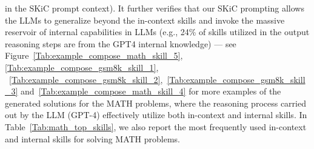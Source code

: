 in the SKiC prompt context). It further verifies that our SKiC prompting allows the LLMs to generalize beyond the in-context skills and invoke the massive reservoir of internal capabilities in LLMs (e.g., 24\% of skills utilized in the output reasoning steps are from the GPT4 internal knowledge) --- see Figure~\ref{Tab:example_compose_math_skill_5}, \ref{Tab:example_compose_gsm8k_skill_1}, ~\ref{Tab:example_compose_gsm8k_skill_2},~\ref{Tab:example_compose_gsm8k_skill_3} and~\ref{Tab:example_compose_math_skill_4} for more examples of the generated solutions for the MATH problems, where the reasoning process carried out by the LLM (GPT-4) effectively utilize both in-context and internal skills. In Table~\ref{Tab:math_top_skills}, we also report the most frequently used in-context and internal skills for solving MATH problems.










\begin{table}[t]
\caption{Testing accuracy and internal skill activation rate on the MATH benchmark. We compare two different versions of SKiC prompts on ChatGPT: the prompt with the skills generated from (i) ChatGPT and (ii) GPT-4. The \emph{internal skill activation rate} refers to the average proportion of skills utilized per question that originate from pre-trained knowledge (i.e., internal skills) rather than from the SKiC prompt context (i.e., the in-context skills).} \label{Tab:math_ablation_results}
\centering
{}
\end{table}




